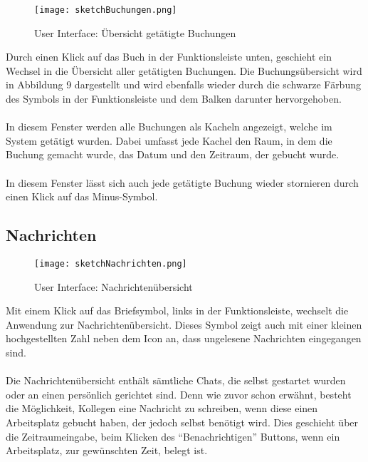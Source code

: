 \begin{wrapfigure}[20]{r}{5.5cm}
  \texttt{[image: sketchBuchungen.png]}
  \caption{User Interface: Übersicht getätigte Buchungen}
\end{wrapfigure}

Durch einen Klick auf das Buch in der Funktionsleiste unten, geschieht ein Wechsel in die Übersicht aller getätigten Buchungen.
Die Buchungsübersicht wird in Abbildung 9 dargestellt und wird ebenfalls wieder durch die schwarze Färbung des Symbols in der Funktionsleiste und dem Balken darunter hervorgehoben. \\
\paragraph{}In diesem Fenster werden alle Buchungen als Kacheln angezeigt, welche im System getätigt wurden.
Dabei umfasst jede Kachel den Raum, in dem die Buchung gemacht wurde, das Datum und den Zeitraum, der gebucht wurde. \\
\paragraph{}In diesem Fenster lässt sich auch jede getätigte Buchung wieder stornieren durch einen Klick auf das Minus-Symbol.

\newpage
\subsection{Nachrichten}

\begin{wrapfigure}[23]{l}{5.5cm}
  \texttt{[image: sketchNachrichten.png]}
  \caption{User Interface: Nachrichtenübersicht}
\end{wrapfigure}

Mit einem Klick auf das Briefsymbol, links in der Funktionsleiste, wechselt die Anwendung zur Nachrichtenübersicht.
Dieses Symbol zeigt auch mit einer kleinen hochgestellten Zahl neben dem Icon an, dass ungelesene Nachrichten eingegangen sind.
\paragraph{}Die Nachrichtenübersicht enthält sämtliche Chats, die selbst gestartet wurden oder an einen persönlich gerichtet sind. 
Denn wie zuvor schon erwähnt, besteht die Möglichkeit, Kollegen eine Nachricht zu schreiben, wenn diese einen Arbeitsplatz gebucht haben, der jedoch selbst benötigt wird. 
Dies geschieht über die Zeitraumeingabe, beim Klicken des "`Benachrichtigen"' Buttons, wenn ein Arbeitsplatz, zur gewünschten Zeit, belegt ist.
